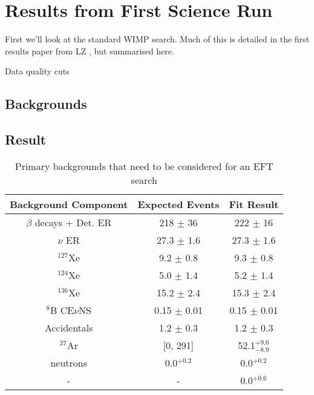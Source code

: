 \section{Results from First Science Run}

\par
First we'll look at the standard WIMP search.
Much of this is detailed in the first results paper from LZ \cite{lz_ws_sr1_ref}, but summarised here.

\par
Data quality cuts

\subsection{Backgrounds}




\subsection{Result}




\begin{table}[]
    \centering
    \begin{tabular}{c|c|c}
        Background Component     & Expected Events    & Fit Result  \\ \hline
        $\beta$ decays + Det. ER & 218 $\pm$ 36       & 222 $\pm$ 16 \\
        $\nu$ ER                 & 27.3 $\pm$ 1.6     & 27.3 $\pm$ 1.6 \\
        ${}^{127}$Xe             & 9.2 $\pm$ 0.8      & 9.3 $\pm$ 0.8 \\
        ${}^{124}$Xe             & 5.0 $\pm$ 1.4      & 5.2 $\pm$ 1.4 \\
        ${}^{136}$Xe             & 15.2 $\pm$ 2.4     & 15.3 $\pm$ 2.4 \\
        ${}^{8}$B CE$\nu$NS      & 0.15 $\pm$ 0.01    & 0.15 $\pm$ 0.01 \\
        Accidentals              & 1.2 $\pm$ 0.3      & 1.2 $\pm$ 0.3 \\
        ${}^{37}$Ar              & [0, 291]           & 52.1${}^{+9.6}_{-8.9}$ \\
        neutrons                 & 0.0${}^{+0.2}$     & 0.0${}^{+0.2}$ \\
        -                        & -                  & 0.0${}^{+0.6}$ 
    \end{tabular}
    \caption{Primary backgrounds that need to be considered for an EFT search}
    \label{tab:sr1_ws_lz_backgrounds}
\end{table}
